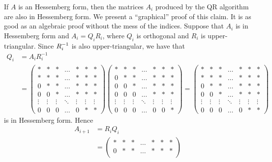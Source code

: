 \begin{rmk}
If $A$ is an Hessemberg form, then the matrices $A_i$ produced by the QR
algorithm are also in Hessemberg form.  We present a ``graphical''
proof of this claim.  It is as good as an algebraic proof without the
mess of the indices.  Suppose that $A_i$ is in Hessemberg
form and $A_i = Q_iR_i$, where $Q_i$ is orthogonal and $R_i$ is
upper-triangular.  Since $\displaystyle R_i^{-1}$ is also
upper-triangular, we have that
\begin{align*}
Q_i &= A_i R_i^{-1} \\
&= \begin{pmatrix}
* & * & * & \ldots & * & * & * \\
* & * & * & \ldots & * & * & * \\
0 & * & * & \ldots & * & * & * \\
0 & 0 & * & \ldots & * & * & * \\
\vdots & \vdots & \vdots & \ddots & \vdots & \vdots & \vdots \\
0 & 0 & 0 & \ldots & 0 & * & *
\end{pmatrix}
\begin{pmatrix}
* & * & * & \ldots & * & * & * \\
0 & * & * & \ldots & * & * & * \\
0 & 0 & * & \ldots & * & * & * \\
0 & 0 & 0 & \ldots & * & * & * \\
\vdots & \vdots & \vdots & \ddots & \vdots & \vdots & \vdots \\
0 & 0 & 0 & \ldots & 0 & 0 & *
\end{pmatrix}
=
\begin{pmatrix}
* & * & * & \ldots & * & * & * \\
* & * & * & \ldots & * & * & * \\
0 & * & * & \ldots & * & * & * \\
0 & 0 & * & \ldots & * & * & * \\
\vdots & \vdots & \vdots & \ddots & \vdots & \vdots & \vdots \\
0 & 0 & 0 & \ldots & 0 & * & *
\end{pmatrix}
\end{align*}
is in Hessemberg form.  Hence
\begin{align*}
A_{i+1} &= R_i Q_i \\
&= \begin{pmatrix}
* & * & * & \ldots & * & * & * \\
0 & * & * & \ldots & * & * & * \\

\end{pmatrix}
\end{align*}
\end{rmk}
